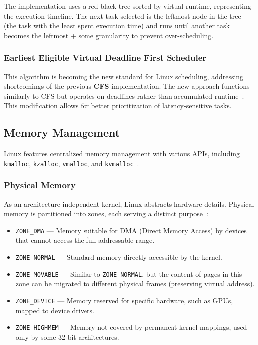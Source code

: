 \documentclass[a4paper,10pt,twoside]{report}
\theoremstyle{definition}
\begin{document}
The implementation uses a red-black tree sorted by virtual runtime, representing the execution timeline. The next task selected is the leftmost node in the tree (the task with the least spent execution time) and runs until another task becomes the leftmost + some granularity to prevent over-scheduling.

\subsubsection{Earliest Eligible Virtual Deadline First Scheduler}

This algorithm is becoming the new standard for Linux scheduling, addressing shortcomings of the previous \textbf{CFS} implementation. The new approach functions similarly to CFS but operates on deadlines rather than accumulated runtime~\cite{linux_eevdf}. This modification allows for better prioritization of latency-sensitive tasks.

\subsection{Memory Management}
\label{subsec:linux_mem}

Linux features centralized memory management with various APIs, including \texttt{kmalloc}, \texttt{kzalloc}, \texttt{vmalloc}, and \texttt{kvmalloc}~\cite{linux_mem_interfaces}.

\subsubsection{Physical Memory}
As an architecture-independent kernel, Linux abstracts hardware details. Physical memory is partitioned into zones, each serving a distinct purpose~\cite{linux_mem_phys}:

\begin{itemize}
    \item \texttt{ZONE\_DMA} --- Memory suitable for DMA (Direct Memory Access) by devices that cannot access the full addressable range.
    \item \texttt{ZONE\_NORMAL} --- Standard memory directly accessible by the kernel.
    \item \texttt{ZONE\_MOVABLE} --- Similar to \texttt{ZONE\_NORMAL}, but the content of pages in this zone can be migrated to different physical frames (preserving virtual address).
    \item \texttt{ZONE\_DEVICE} --- Memory reserved for specific hardware, such as GPUs, mapped to device drivers.
    \item \texttt{ZONE\_HIGHMEM} --- Memory not covered by permanent kernel mappings, used only by some 32-bit architectures.
\end{itemize}
\end{document}
